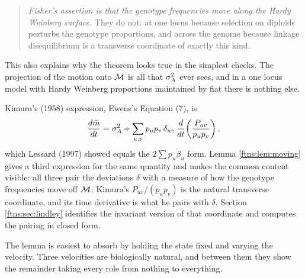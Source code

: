 \begin{quote}
\emph{Fisher's assertion is that the genotype frequencies move along the Hardy Weinberg
surface.} They do not: at one locus because selection on diploids perturbs the genotype
proportions, and across the genome because linkage disequilibrium is a transverse coordinate of
exactly this kind.
\end{quote}

This also explains why the theorem looks true in the simplest checks. The projection of the motion
onto $\mathcal{M}$ is all that $\sigma^{2}_{A}$ ever sees, and in a one locus model with Hardy Weinberg proportions
maintained by fiat there is nothing else.

Kimura's (1958) expression, Ewens's Equation (7), is
\[
\frac{d\bar{m}}{dt}=\sigma^{2}_{A}+\sum_{u,v}p_up_v\,\delta_{uv}\,\frac{d}{dt}\!\left(\frac{P_{uv}}{p_up_v}\right),
\]
which Lessard (1997) showed equals the $2\sum p_u\dot\beta_u$ form. Lemma \ref{ftns:lem:moving} gives a
third expression for the same quantity and makes the common content visible: all three pair the
deviations $\delta$ with a measure of how the genotype frequencies move off $\mathcal{M}$. Kimura's
$P_{uv}/(p_up_v)$ is the natural transverse coordinate, and its time derivative is what he pairs
with $\delta$. Section \ref{ftns:sec:lindley} identifies the invariant version of that coordinate and
computes the pairing in closed form.

The lemma is easiest to absorb by holding the state fixed and varying the velocity. Three
velocities are biologically natural, and between them they show the remainder taking every role
from nothing to everything.

